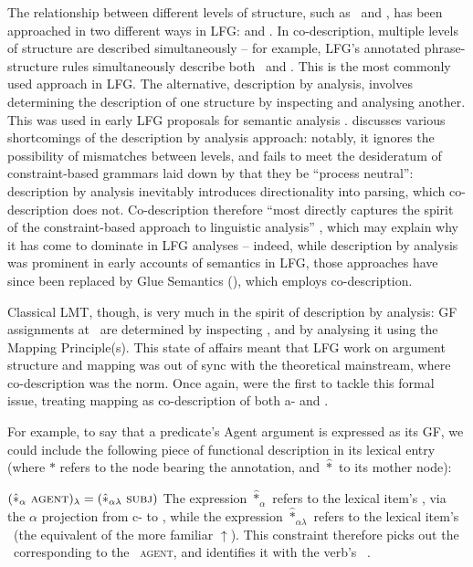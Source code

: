 \documentclass[output=paper]{langscibook}
\begin{document}
The relationship between different levels of structure, such as \astruc\ and
\fstruc, has been approached in two different ways in LFG: 
and  \citep[267--270]{kaplan1995formal,DLM:LFG}. In
co-description, multiple levels of structure are described simultaneously -- for
example, LFG's annotated phrase-structure rules simultaneously describe both
\cstruc\ and \fstruc. This is the most commonly used approach in LFG. The
alternative, description by analysis, involves determining the description of
one structure by inspecting and analysing another. This was used in early LFG
proposals for semantic analysis \citep[e.g.][]{halvorsen83}.
\citet[344--345]{findlay2021} discusses various shortcomings of the description
by analysis approach: notably, it ignores the possibility of mismatches between
levels, and fails to meet the desideratum of constraint-based grammars laid down
by \citet[13]{pollard1994head-driven} that they be ``process neutral'':
description by analysis inevitably introduces directionality into parsing, which
co-description does not. Co-description therefore ``most directly captures the
spirit of the constraint-based approach to linguistic analysis''
\citep[344]{findlay2021}, which may explain why it has come to dominate in LFG
analyses -- indeed, while description by analysis was prominent in early
accounts of semantics in LFG, those approaches have since been replaced by Glue
Semantics (\citealp{dalrympleetal93,Dalrymple:Glue,asudeh22}), which employs
co-description.

Classical LMT, though, is very much in the spirit of description by analysis: GF
assignments at \fstruc\ are determined by inspecting \astruc, and by analysing
it using the Mapping Principle(s). This state of affairs meant that LFG work on
argument structure and mapping was out of sync with the theoretical mainstream,
where co-description was the norm. Once again, \citet[6]{butt1997architecture}
were the first to tackle this formal issue, treating mapping as co-description
of both a- and \fstruc.

For example, to say that a predicate's Agent argument is expressed as its \SUBJ
GF, we could include the following piece of functional description in its
lexical entry (where $*$ refers to the \cstruc{} node bearing the annotation,
and $\hat{*}$ to its mother node):

\ea\label{ex:simple-butt-etal-mapping}
$(\hat{*}_{\alpha}\ \textsc{agent})_{\lambda} = (\hat{*}_{\alpha\lambda}\ \textsc{subj}{})$
\z
\newpage\noindent
The expression $\hat*_{\alpha}$ refers to the lexical item's \astruc, via the
$\alpha$ projection from c- to \astruc, while the expression
$\hat*_{\alpha\lambda}$ refers to the lexical item's \fstruc\ (the equivalent of
the more familiar $\uparrow$). This constraint therefore picks out the \fstruc\
corresponding to the \astruc\ \textsc{agent}, and identifies it with the verb's
\fstruc\ \SUBJ.
\end{document}
